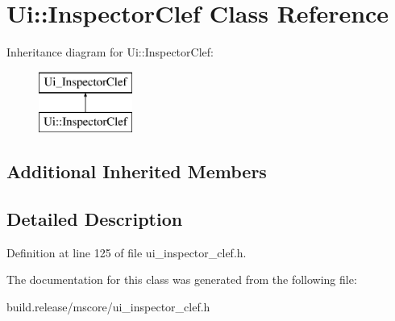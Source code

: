 \hypertarget{class_ui_1_1_inspector_clef}{}\section{Ui\+:\+:Inspector\+Clef Class Reference}
\label{class_ui_1_1_inspector_clef}
Inheritance diagram for Ui\+:\+:Inspector\+Clef\+:\begin{figure}[H]
\begin{center}
\leavevmode
\includegraphics[height=2.000000cm]{class_ui_1_1_inspector_clef}
\end{center}
\end{figure}
\subsection*{Additional Inherited Members}


\subsection{Detailed Description}


Definition at line 125 of file ui\+\_\+inspector\+\_\+clef.\+h.



The documentation for this class was generated from the following file\+:\begin{DoxyCompactItemize}
\item 
build.\+release/mscore/ui\+\_\+inspector\+\_\+clef.\+h\end{DoxyCompactItemize}
